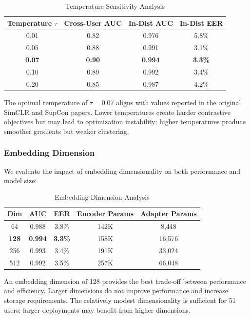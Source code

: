 \documentclass{ieeeaccess}
\begin{document}
{\begin{table}[h]
\caption{Temperature Sensitivity Analysis}
\label{tab:temp_ablation}
\centering
\begin{tabular}{|c|c|c|c|}
\hline
\textbf{Temperature $\tau$} & \textbf{Cross-User AUC} & \textbf{In-Dist AUC} & \textbf{In-Dist EER} \\
\hline
0.01 & 0.82 & 0.976 & 5.8\% \\
0.05 & 0.88 & 0.991 & 3.1\% \\
\textbf{0.07} & \textbf{0.90} & \textbf{0.994} & \textbf{3.3\%} \\
0.10 & 0.89 & 0.992 & 3.4\% \\
0.20 & 0.85 & 0.987 & 4.2\% \\
\hline
\end{tabular}
\end{table}

The optimal temperature of $\tau = 0.07$ aligns with values reported in the original SimCLR and SupCon papers. Lower temperatures create harder contrastive objectives but may lead to optimization instability; higher temperatures produce smoother gradients but weaker clustering.

\subsubsection{Embedding Dimension}
We evaluate the impact of embedding dimensionality on both performance and model size:

\begin{table}[h]
\caption{Embedding Dimension Analysis}
\label{tab:embed_dim}
\centering
\begin{tabular}{|c|c|c|c|c|}
\hline
\textbf{Dim} & \textbf{AUC} & \textbf{EER} & \textbf{Encoder Params} & \textbf{Adapter Params} \\
\hline
64 & 0.988 & 3.8\% & 142K & 8,448 \\
\textbf{128} & \textbf{0.994} & \textbf{3.3\%} & 158K & 16,576 \\
256 & 0.993 & 3.4\% & 191K & 33,024 \\
512 & 0.992 & 3.5\% & 257K & 66,048 \\
\hline
\end{tabular}
\end{table}

An embedding dimension of 128 provides the best trade-off between performance and efficiency. Larger dimensions do not improve performance and increase storage requirements. The relatively modest dimensionality is sufficient for 51 users; larger deployments may benefit from higher dimensions.

}
\end{document}
